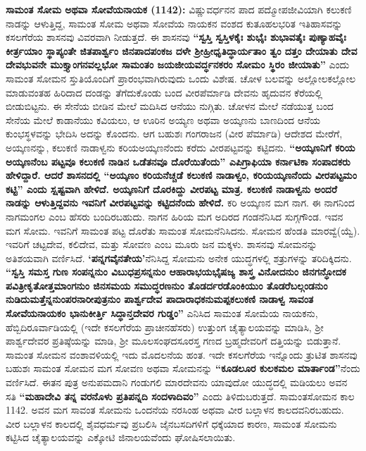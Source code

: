 \textbf{ಸಾಮಂತ ಸೋಮ ಅಥವಾ ಸೋವೆಯನಾಯಕ (1142):} ವಿಷ್ಣುವರ್ಧನನ ಪಾದ ಪದ್ಮೋಪಜೀವಿಯಾಗಿ ಕಲುಕಣಿ ನಾಡನ್ನು ಆಳುತ್ತಿದ್ದ, ಸಾಮಂತ ಸೋಮ ಅಥವಾ ಸೋವೆಯ ನಾಯಕನ ವಂಶದ ಕುತೂಹಲಭರಿತ ಇತಿಹಾಸವನ್ನು ಕಸಲಗೆರೆಯ ಶಾಸನವು ವಿವರವಾಗಿ ನೀಡುತ್ತದೆ. ಈ ಶಾಸನವು \textbf{“ಸ್ವಸ್ತಿ ಸ್ವಸ್ತಿಳಕೈಃ ಶುಭೈಃ ಶುಭಾವತೈಃ ಪುಣ್ಯಾಹವೈಃ ಕೀರ್ತ್ರಯಾಂ ಸ್ಥಾಪ್ಯಂತೇ ಜಿತಪಾರ್ಶ್ವಂ ಜಿನಪಾದಪಂಕಜ ದಳೇ ಶ‍್ರೀಹ್ರೀಧೃತಿದ್ಧಾರ್ಯತಾಂ ತ್ವಂ ದತ್ತಂ ದೇಯಾತು ದೇವ ದೇವಭುವನೇ ಮುಕ್ತ್ಯಾಂಗನವಲ್ಲಭೋ ಸಾಮಂತಂ ಜಯಜೀಯವರ್ದ್ಧನಕರಂ ಸೋಮಂ ಸ್ಥಿರಂ ಜೀಯಾತು”} ಎಂದು ಸಾಮಂತ ಸೋಮನ ಸ್ತುತಿಯೊಂದಿಗೆ ಪ್ರಾರಂಭವಾಗಿರುವುದು ಒಂದು ವಿಶೇಷ. ಚೋಳ ಬಲವನ್ನು ಅಲ್ಲೋಲಕಲ್ಲೋಲ ಮಾಡುವಂತಹ ಹಿರಿದಾದ ದಂಡನ್ನು ತೆಗೆದುಕೊಂಡು ಬಂದ ವೀರಪೆರ್ಮಾಡಿ ದೇವನು ಹೃದುವನ ಕೆರೆಯಲ್ಲಿ ಬೀಡುಬಿಟ್ಟನು. ಈ ಸೇನೆಯ ಬೀಡಿನ ಮೇಲೆ ಮದಿಸಿದ ಆನೆಯು ನುಗ್ಗಿತು. ಚೋಳನ ಮೇಲೆ ನಡೆಯುತ್ತ ಬಂದ ಸೇನೆಯ ಮೇಲೆ ಕಾಡಾನೆಯು ಕವಿಯಲು, ಆ ಊರಿನ ಅಯ್ಯಣ ಅಥವಾ ಅಯ್ಕಣನು ಬಾಣದಿಂದ ಆನೆಯ ಕುಂಭಸ್ಥಳವನ್ನು ಭೇದಿಸಿ ಅದನ್ನು ಕೊಂದನು. ಆಗ ಬಹುಶಃ ಗಂಗರಾಜನ (ವೀರ ಪೆರ್ಮಾಡಿ) ಆದೇಶದ ಮೇರೆಗೆ, ಅಯ್ಕಣನನ್ನು, ಕಲುಕಣಿ ನಾಡಾಳ್ವನು ಕರಿಯಅಯ್ಕಣನೆಂದು ಕರೆದು ವೀರಪಟ್ಟವನ್ನು ಕಟ್ಟಿದನು. \textbf{“ಅಯ್ಕಣನಿಗೆ ಕರಿಯ ಅಯ್ಕಣನೆಂಬ ಪಟ್ಟವೂ ಕಲುಕಣಿ ನಾಡಿನ ಒಡೆತನವೂ ದೊರೆಯಿತೆಂದು” ಎಪಿಗ್ರಾಫಿಯಾ ಕರ್ನಾಟಿಕಾ ಸಂಪಾದಕರು ಹೇಳಿದ್ದಾರೆ. ಆದರೆ ಶಾಸನದಲ್ಲಿ “ಅಯ್ಕಣಂ ಕರಿಯನೆಚ್ಚಡೆ ಕಲುಕಣಿ ನಾಡಾಳ್ವಂ, ಕರಿಯಯ್ಕಣನೆಂದು ವೀರಪಟ್ಟಮಂ ಕಟ್ಟಿ” ಎಂದು ಸ್ಷಷ್ಟವಾಗಿ ಹೇಳಿದೆ. ಅಯ್ಕಣನಿಗೆ ದೊರಕಿದ್ದು ವೀರಪಟ್ಟ ಮಾತ್ರ. ಕಲುಕಣಿ ನಾಡಾಳ್ವನು ಅಂದರೆ ನಾಡನ್ನು ಆಳುತ್ತಿದ್ದವನು ಇವನಿಗೆ ವೀರಪಟ್ಟವನ್ನು ಕಟ್ಟಿದನೆಂದು ಹೇಳಿದೆ.} ಕರಿ ಅಯ್ಕಣನ ಮಗ ನಾಗ. ಈ ನಾಗನಿಂದ ನಾಗಮಂಗಲ ಎಂಬ ಹೆಸರು ಬಂದಿರಬಹುದು. ನಾಗನ ಹಿರಿಯ ಮಗ ಅದಿರದ ಗಂಡನೆನಿಸಿದ ಸುಗ್ಗಗೌಂಡ. ಇವನ ಮಗ ಸೋಮ. ಇವನಿಗೆ ಸಾಮಂತ ಪಟ್ಟ ದೊರೆತು ಸಾಮಂತ ಸೋಮನೆನಿಸಿದನು. ಸೋಮನ ಹೆಂಡತಿ ಮಾರವ್ವೆ(ಯ್ವೆ). ಇವರಿಗೆ ಚಟ್ಟದೇವ, ಕಲಿದೇವ, ಮತ್ತು ಸೋವಣ ಎಂಬ ಮೂರು ಜನ ಮಕ್ಕಳು. ಶಾಸನವು ಸೋಮನನ್ನು ಅತಿಶಯವಾಗಿ ವರ್ಣಿಸಿದೆ. \textbf{‘ಪನ್ನಗವೈನತೇಯ’}ನೆನಿಸಿದ್ದ ಸೋಮನು ಅನೇಕ ಯುದ್ಧಗಳಲ್ಲಿ ಶತ್ರುಗಳನ್ನು ತರಿದಿಕ್ಕಿದನು. \textbf{“ಸ್ವಸ್ತಿ ಸಮಸ್ತ ಗುಣ ಸಂಪನ್ನನುಂ ವಿಬುಧಪ್ರಸನ್ನನುಂ ಆಹಾರಾಭಯಭೈಷಜ್ಯ ಶಾಸ್ತ್ರ ವಿನೋದನುಂ ಜಿನಗನ್ಧೋದಕ ಪವಿತ್ರೀಕೃತೋತ್ತಮಾಂಗನುಂ ಜಿನಸಮಯ ಸಮುದ್ಧರಣನುಂ ತೊಡರ್ದರಡೊಂಕಿಯುಂ ತೊಡರೆಬಲ್ಗಂಡನುಂ ನುಡಿದುಮತ್ತೆನ್ನನುಂಪರನಾರೀಪುತ್ರನುಂ ಪಾರ್ಶ್ವದೇವ ಪಾದಾರಾಧಕನುಮಪ್ಪಕಲುಕಣಿ ನಾಡಾಳ್ವ ಸಾವಂತ ಸೋವೆಯನಾಯಕಂ ಭಾನುಕೀರ್ತ್ತಿ ಸಿದ್ಧಾನ್ತದೇವರ ಗುಡ್ಡಂ”} ಎನಿಸಿದ ಸಾಮಂತ ಸೋಮೆಯ ನಾಯಕನು, ಹೆಬ್ಬಿದಿರೂರ್ವಾಡಿಯಲ್ಲಿ (ಇದೇ ಕಸಲಗೆರೆಯ ಪ್ರಾಚೀನ\break ಹೆಸರು) ಉತ್ತುಂಗ ಚೈತ್ಯಾಲಯವನ್ನು ಮಾಡಿಸಿ, ಶ‍್ರೀ ಪಾರ್ಶ್ವದೇವರ ಪ್ರತಿಷ್ಠೆಯನ್ನು ಮಾಡಿ, ಶ‍್ರೀ ಮೂಲಸಂಘದ\break ಸೂರಸ್ತ ಗಣದ ಬ್ರಹ್ಮದೇವರಿಗೆ ದತ್ತಿಯನ್ನು ಬಿಡುತ್ತಾನೆ. ಸಾಮಂತ ಸೋಮನ ವಂಶಾವಳಿಯಲ್ಲಿ ಇದು ಮೊದಲನೆಯ ಹಂತ. ಇದೇ ಕಸಲಗೆರೆಯ ಇನ್ನೊಂದು ತ್ರುಟಿತ ಶಾಸನವು ಬಹುಶಃ ಸಾಮಂತ ಸೋಮನ ಮಗ ಸೋವಣ ಅಥವಾ ಸೋಮನನ್ನು \textbf{“ಕೂಡಲೂರ ಕುಲಕಮಲ ಮಾರ್ತಾಂಡ”}ನೆಂದು ವರ್ಣಿಸಿದೆ. ಈತನ ಪುತ್ರ ಅನುಪಮದಾನಿ ಗಂಡುಗಲಿ ಮಾರದೇವನು ಯಾವುದೋ ಯುದ್ಧದಲ್ಲಿ ಮಡಿಯಲು ಅವನ ಸತಿ \textbf{“ಮಹಾದೇವಿ ತನ್ನ ವರನೊಳು ಪ್ರತಿಪನ್ನದಿ ಸಂದಳಾದಿವಂ” }ಎಂದು ತಿಳಿದುಬರುತ್ತದೆ. ಸಾಮಂತಸೋಮನ ಕಾಲ 1142. ಅವನ ಮಗ ಸಾವಂತ ಸೋಮನು ಒಂದನೆಯ ನರಸಿಂಹ ಅಥವಾ ವೀರ ಬಲ್ಲಾಳನ ಕಾಲದವನಿರಬಹುದು. ವೀರ ಬಲ್ಲಾಳನ ಕಾಲದಲ್ಲಿ ಶೈವಧರ್ಮವು ಪ್ರಬಲಿಸಿ ಜೈನಬಸದಿಗಳಿಗೆ ಧಕ್ಕೆಯಾದ ಕಾರಣ, ಸಾಮಂತ ಸೋಮನು ಕಟ್ಟಿಸಿದ ಚೈತ್ಯಾಲಯವನ್ನು ಎಕ್ಕೋಟಿ ಜಿನಾಲಯವೆಂದು ಘೋಷಿಸಲಾಯಿತು.

